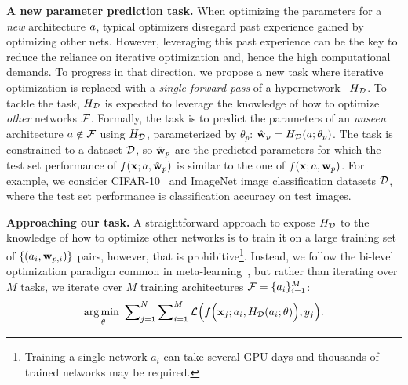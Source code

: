 \textbf{A new parameter prediction task.}
When optimizing the parameters for a \textit{new} architecture $a$, typical optimizers disregard past experience gained by optimizing other nets. However, leveraging this past experience can be the key to reduce the reliance on iterative optimization and, hence the high computational demands.
To progress in that direction, we propose a new task where iterative optimization is replaced with a \textit{single forward pass} of a hypernetwork~\citep{ha2016hypernetworks} $H_{\mathcal{D}}$.
To tackle the task, $H_{\mathcal{D}}$ is expected to leverage the knowledge of how to optimize \textit{other}	networks $\mathcal{F}$.
Formally, the task is to predict the parameters of an \textit{unseen} architecture $a \notin \mathcal{F}$ using $H_{\mathcal{D}}$, parameterized by $\theta_p$: $\hat{\mathbf{w}}_p=H_{\mathcal{D}}(a; \theta_p)$.
The task is constrained to a dataset $\mathcal{D}$, so $\hat{\mathbf{w}}_p$ are the predicted parameters for which the test set performance of $f(\mathbf{x}; a, \hat{\mathbf{w}}_p)$ is similar to the one of $f(\mathbf{x}; a, \mathbf{w}_p)$.
For example, we consider CIFAR-10~\citep{krizhevsky2009learning} and ImageNet image classification datasets $\mathcal{D}$, where the test set performance is classification accuracy on test images.

\textbf{Approaching our task.}
A straightforward approach to expose $H_{\mathcal{D}}$ to the knowledge of how to optimize other networks is to train it on a large training set of $\{(a_i, \mathbf{w}_{p,i})\}$ pairs, however, that is prohibitive\footnote{Training a single network $a_i$ can take several GPU days and thousands of trained networks may be required.}. Instead, we follow the bi-level optimization paradigm common in meta-learning~\citep{hospedales2020meta,andrychowicz2016learning,ravi2016optimization}, but rather than iterating over $M$ tasks, we iterate over $M$ training architectures $\mathcal{F}=\{a_i\}_{i=1}^M$:
%
\begin{equation}
\label{eq:solution}
\underset{\theta}{\text{arg\,min }} \sum\nolimits_{j=1}^N \sum\nolimits_{i=1}^{M}{\cal L}\Big(f\Big( \mathbf{x}_j; a_i,  H_{\mathcal{D}}(a_i;{\theta})\Big), y_j\Big).
\end{equation}

